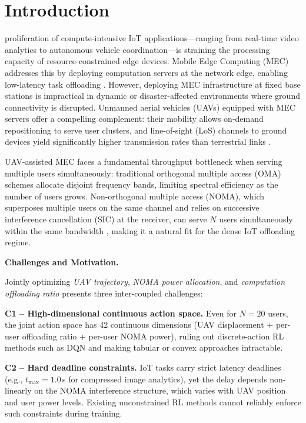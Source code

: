 \documentclass[journal]{IEEEtran}
\begin{document}
\section{Introduction}\label{sec:intro}

 proliferation of compute-intensive IoT
applications---ranging from real-time video analytics to
autonomous vehicle coordination---is straining the processing
capacity of resource-constrained edge devices.
Mobile Edge Computing (MEC) addresses this by deploying
computation servers at the network edge, enabling low-latency
task offloading \cite{mao2017mec_survey,shi2016mec_vision}.
However, deploying MEC infrastructure at fixed base stations
is impractical in dynamic or disaster-affected environments
where ground connectivity is disrupted.
Unmanned aerial vehicles (UAVs) equipped with MEC servers offer
a compelling complement: their mobility allows on-demand
repositioning to serve user clusters, and line-of-sight (LoS)
channels to ground devices yield significantly higher
transmission rates than terrestrial links
\cite{zeng2019uav_survey,mozaffari2019uav_tutorial}.

UAV-assisted MEC faces a fundamental throughput bottleneck
when serving multiple users simultaneously:
traditional orthogonal multiple access (OMA) schemes allocate
disjoint frequency bands, limiting spectral efficiency as the
number of users grows.
Non-orthogonal multiple access (NOMA), which superposes
multiple users on the same channel and relies on successive
interference cancellation (SIC) at the receiver, can serve
$N$ users simultaneously within the same bandwidth
\cite{ding2017noma,liu2017noma_proc,ding2017noma_survey},
making it a natural fit for the dense IoT offloading regime.

\noindent\textbf{Challenges and Motivation.}

Jointly optimizing \emph{UAV trajectory}, \emph{NOMA power allocation},
and \emph{computation offloading ratio} presents three
inter-coupled challenges:

\textbf{C1 -- High-dimensional continuous action space.}
Even for $N{=}20$ users, the joint action space has 42 continuous
dimensions (UAV displacement + per-user offloading ratio +
per-user NOMA power), ruling out discrete-action RL methods
such as DQN and making tabular or convex approaches intractable.

\textbf{C2 -- Hard deadline constraints.}
IoT tasks carry strict latency deadlines (e.g., $t_{\max}{=}1.0$\,s
for compressed image analytics), yet the delay depends
non-linearly on the NOMA interference structure, which varies
with UAV position and user power levels.
Existing unconstrained RL methods cannot reliably enforce such
constraints during training.
\end{document}
